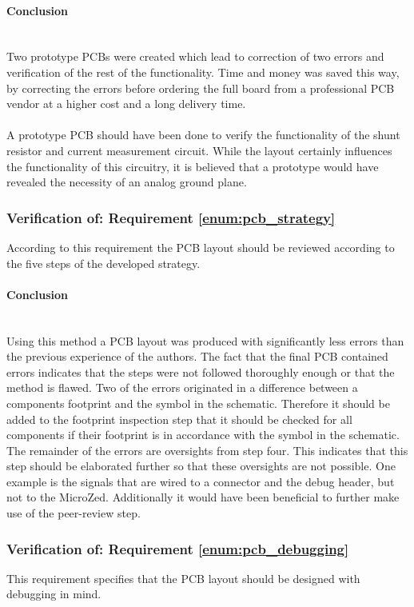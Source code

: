 \paragraph{Conclusion}~\\
Two prototype PCBs were created which lead to correction of two errors and verification of the rest of the functionality.
Time and money was saved this way, by correcting the errors before ordering the full board from a professional PCB vendor at a higher cost and a long delivery time.
\\~\\
A prototype PCB should have been done to verify the functionality of the shunt resistor and current measurement circuit.
While the layout certainly influences the functionality of this circuitry, it is believed that a prototype would have revealed the necessity of an analog ground plane.

\subsubsection{Verification of: Requirement \ref{enum:pcb_strategy}} %
\label{ssub:requirement_enum:pcb_strategy}
According to this requirement the PCB layout should be reviewed according to the five steps of the developed strategy.
\paragraph{Conclusion}~\\
Using this method a PCB layout was produced with significantly less errors than the previous experience of the authors.
The fact that the final PCB contained errors indicates that the steps were not followed thoroughly enough or that the method is flawed.
Two of the errors originated in a difference between a components footprint and the symbol in the schematic.
Therefore it should be added to the footprint inspection step that it should be checked for all components if their footprint is in accordance with the symbol in the schematic.
The remainder of the errors are oversights from step four.
This indicates that this step should be elaborated further so that these oversights are not possible.
One example is the signals that are wired to a connector and the debug header, but not to the MicroZed.
Additionally it would have been beneficial to further make use of the peer-review step.

\subsubsection{Verification of: Requirement \ref{enum:pcb_debugging}} %
\label{ssub:requirement_enum:pcb_debugging}
This requirement specifies that the PCB layout should be designed with debugging in mind.
